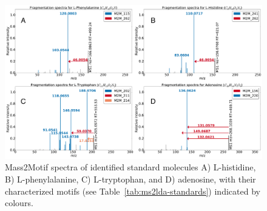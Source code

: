 \begin{figure}[!htbp]
\centering\includegraphics[width=0.8\linewidth]{07-lda/figures/standards.pdf}
\centering\caption{Mass2Motif spectra of identified standard molecules A) L-histidine, B) L-phenylalanine, C) L-tryptophan, and D) adenosine, with their characterized motifs (see Table~\ref{tab:ms2lda-standards}) indicated by colours.\label{fig:m2lda-standards}}
\end{figure}


